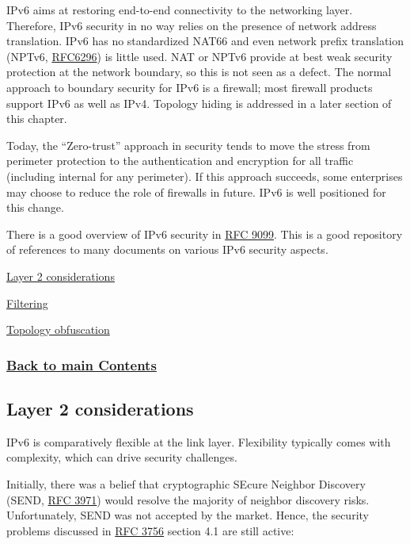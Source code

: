 \documentclass[
]{article}
\begin{document}
IPv6 aims at restoring end-to-end connectivity to the networking layer.
Therefore, IPv6 security in no way relies on the presence of network
address translation. IPv6 has no standardized NAT66 and even network
prefix translation (NPTv6,
\href{https://www.rfc-editor.org/info/rfc6296}{RFC6296}) is little used.
NAT or NPTv6 provide at best weak security protection at the network
boundary, so this is not seen as a defect. The normal approach to
boundary security for IPv6 is a firewall; most firewall products support
IPv6 as well as IPv4. Topology hiding is addressed in a later section of
this chapter.

Today, the ``Zero-trust'' approach in security tends to move the stress
from perimeter protection to the authentication and encryption for all
traffic (including internal for any perimeter). If this approach
succeeds, some enterprises may choose to reduce the role of firewalls in
future. IPv6 is well positioned for this change.

There is a good overview of IPv6 security in
\href{https://www.rfc-editor.org/info/rfc9099}{RFC 9099}. This is a good
repository of references to many documents on various IPv6 security
aspects.

\hyperref[layer-2-considerations]{Layer 2 considerations}

\hyperref[filtering]{Filtering}

\hyperref[topology-obfuscation]{Topology obfuscation}

\subsubsection{\texorpdfstring{\hyperref[list-of-contents]{Back to main
Contents}}{Back to main Contents}}\label{back-to-main-contents-3}

\pagebreak

\subsection{Layer 2 considerations}\label{layer-2-considerations}

IPv6 is comparatively flexible at the link layer. Flexibility typically
comes with complexity, which can drive security challenges.

Initially, there was a belief that cryptographic SEcure Neighbor
Discovery (SEND, \href{https://www.rfc-editor.org/info/rfc3971}{RFC
3971}) would resolve the majority of neighbor discovery risks.
Unfortunately, SEND was not accepted by the market. Hence, the security
problems discussed in \href{https://www.rfc-editor.org/info/rfc3756}{RFC
3756} section 4.1 are still active:
\end{document}
